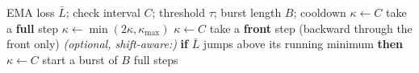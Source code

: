 \begin{algorithm}[t]
\caption{\fw{}: plateau-triggered bursts with cried-wolf backoff}
\label{alg:fw}
\begin{algorithmic}[1]
\State EMA loss $\bar L$; check interval $C$; threshold $\tau$; burst
length $B$; cooldown $\kappa \gets C$
    \State take a \textbf{full} step
        \State $\kappa \gets \min(2\kappa, \kappa_{\max})$
      \Else
        \State $\kappa \gets C$
      \EndIf
    \EndIf
  \Else
    \State take a \textbf{front} step (backward through the front only)
    \State \emph{(optional, shift-aware:)} \textbf{if} $\bar L$ jumps
      above its running minimum \textbf{then} $\kappa \gets C$
        \State start a burst of $B$ full steps
      \EndIf
    \EndIf
  \EndIf
\EndFor
\end{algorithmic}
\end{algorithm}
